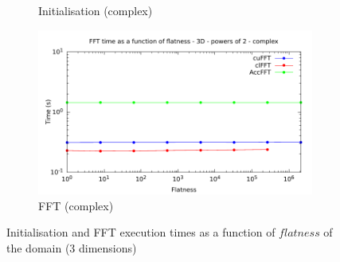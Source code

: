 \documentclass[12pt, a4paper]{article}
\begin{document}
\begin{figure}[htb]
\begin{subfigure}{.5\textwidth}
\caption{Initialisation (complex)}
\label{FLAT1DCI}
\end{subfigure}%
\begin{subfigure}{.5\textwidth}
\centering
\includegraphics[width=.9\linewidth]{graphs/flatness-c-exec.pdf}
\caption{FFT (complex)}
\label{FLAT1DCE}
\end{subfigure}
\caption{Initialisation and FFT execution times as a function of $flatness$ of the domain (3 dimensions)}
\label{FLATNESSGRAPH}
\end{figure}
\end{document}

